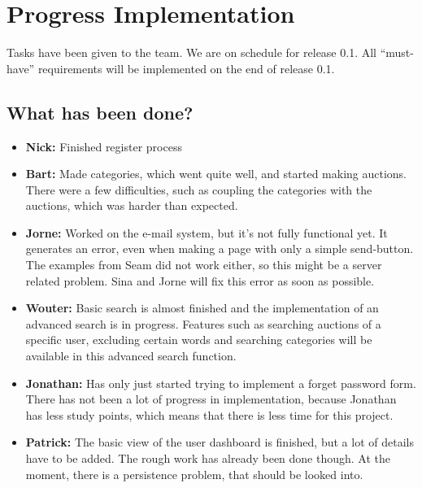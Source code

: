 \documentclass[a4paper, 12pt]{article}
\begin{document}
	\section{Progress Implementation}
Tasks have been given to the team. We are on schedule for release 0.1. All ``must-have'' requirements will be implemented on the end of release 0.1.
		\subsection{What has been done?}	
		\begin{itemize} 
			\item \textbf{Nick:} Finished register process
			\item \textbf{Bart:} Made categories, which went quite well, and started making auctions. There were a few difficulties, such as coupling the categories with the auctions, which was harder than expected.
			\item \textbf{Jorne:} Worked on the e-mail system, but it's not fully functional yet. It generates an error, even when making a page with only a simple send-button. The examples from Seam did not work either, so this might be a server related problem.  Sina and Jorne will fix this error as soon as possible.
			\item \textbf{Wouter:} Basic search is almost finished and the implementation of an advanced search is in progress. Features such as searching auctions of a specific user, excluding certain words and searching categories will be available in this advanced search function.
			\item \textbf{Jonathan:} Has only just started trying to implement a forget password form.  There has not been a lot of progress in implementation, because Jonathan has less study points, which means that there is less time for this project.
			\item \textbf{Patrick:} The basic view of the user dashboard is finished, but a lot of details have to be added. The rough work has already been done though. At the moment, there is a persistence problem, that should be looked into.
		\end{itemize}
\end{document}
